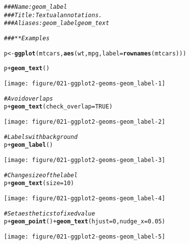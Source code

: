 \documentclass[a4paper,titlepage]{tufte-handout}\usepackage[]{graphicx}\usepackage[]{color}
\makeatletter
\def\maxwidth{ %
  \ifdim\Gin@nat@width>\linewidth
    \linewidth
  \else
    \Gin@nat@width
  \fi
}
\newcommand{\hlnum}[1]{\textcolor[rgb]{0.686,0.059,0.569}{#1}}%
\newcommand{\hlcom}[1]{\textcolor[rgb]{0.678,0.584,0.686}{\textit{#1}}}%
\newcommand{\hlopt}[1]{\textcolor[rgb]{0,0,0}{#1}}%
\newcommand{\hlstd}[1]{\textcolor[rgb]{0.345,0.345,0.345}{#1}}%
\newcommand{\hlkwb}[1]{\textcolor[rgb]{0.69,0.353,0.396}{#1}}%
\newcommand{\hlkwc}[1]{\textcolor[rgb]{0.333,0.667,0.333}{#1}}%
\newcommand{\hlkwd}[1]{\textcolor[rgb]{0.737,0.353,0.396}{\textbf{#1}}}%
\newenvironment{kframe}{%
 \def\at@end@of@kframe{}%
 \ifinner\ifhmode%
  \def\at@end@of@kframe{\end{minipage}}%
  \begin{minipage}{\columnwidth}%
 \fi\fi%
 \def\FrameCommand##1{\hskip\@totalleftmargin \hskip-\fboxsep
 \colorbox{shadecolor}{##1}\hskip-\fboxsep
     \hskip-\linewidth \hskip-\@totalleftmargin \hskip\columnwidth}%
 \MakeFramed {\advance\hsize-\width
   \@totalleftmargin\z@ \linewidth\hsize
   \@setminipage}}%
 {\par\unskip\endMakeFramed%
 \at@end@of@kframe}
\newenvironment{knitrout}{}{} %
\makeatother
\begin{document}
\begin{knitrout}
\color{fgcolor}\begin{kframe}
\begin{alltt}
\hlcom{### Name: geom_label}
\hlcom{### Title: Textual annotations.}
\hlcom{### Aliases: geom_label geom_text}

\hlcom{### ** Examples}

\hlstd{p} \hlkwb{<-} \hlkwd{ggplot}\hlstd{(mtcars,} \hlkwd{aes}\hlstd{(wt, mpg,} \hlkwc{label} \hlstd{=} \hlkwd{rownames}\hlstd{(mtcars)))}

\hlstd{p} \hlopt{+} \hlkwd{geom_text}\hlstd{()}
\end{alltt}
\end{kframe}
\texttt{[image: figure/021-ggplot2-geoms-geom\_label-1]} 
\begin{kframe}\begin{alltt}
\hlcom{# Avoid overlaps}
\hlstd{p} \hlopt{+} \hlkwd{geom_text}\hlstd{(}\hlkwc{check_overlap} \hlstd{=} \hlnum{TRUE}\hlstd{)}
\end{alltt}
\end{kframe}
\texttt{[image: figure/021-ggplot2-geoms-geom\_label-2]} 
\begin{kframe}\begin{alltt}
\hlcom{# Labels with background}
\hlstd{p} \hlopt{+} \hlkwd{geom_label}\hlstd{()}
\end{alltt}
\end{kframe}
\texttt{[image: figure/021-ggplot2-geoms-geom\_label-3]} 
\begin{kframe}\begin{alltt}
\hlcom{# Change size of the label}
\hlstd{p} \hlopt{+} \hlkwd{geom_text}\hlstd{(}\hlkwc{size} \hlstd{=} \hlnum{10}\hlstd{)}
\end{alltt}
\end{kframe}
\texttt{[image: figure/021-ggplot2-geoms-geom\_label-4]} 
\begin{kframe}\begin{alltt}
\hlcom{# Set aesthetics to fixed value}
\hlstd{p} \hlopt{+} \hlkwd{geom_point}\hlstd{()} \hlopt{+} \hlkwd{geom_text}\hlstd{(}\hlkwc{hjust} \hlstd{=} \hlnum{0}\hlstd{,} \hlkwc{nudge_x} \hlstd{=} \hlnum{0.05}\hlstd{)}
\end{alltt}
\end{kframe}
\texttt{[image: figure/021-ggplot2-geoms-geom\_label-5]} 
\begin{kframe}\begin{alltt}

\end{alltt}
\end{kframe}
\end{knitrout}
\end{document}
